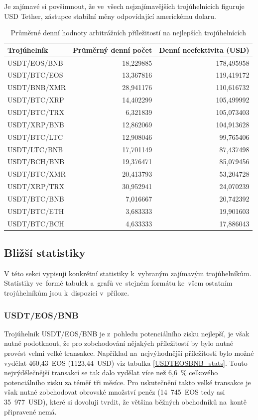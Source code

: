 \documentclass[thesis=B,czech]{FITthesis}[2019/03/21]
\begin{document}
Je zajímavé si povšimnout, že ve~všech nejzajímavějších trojúhelnících figuruje USD Tether, zástupce stabilní měny odpovídající americkému dolaru.


\begin{table}\centering
\caption{Průměrné denní hodnoty arbitrážních příležitostí na nejlepších trojúhelnících}
\label{table_combined_best}
\begin{tabular}{|| l | r | r ||}\hline Trojúhelník & Průměrný denní počet & Denní neefektivita (USD)\\
 \hline
 \hline USDT/EOS/BNB & 18,229885 & 178,495958\\ 
 \hline USDT/BTC/EOS & 13,367816 & 119,419172\\ 
 \hline USDT/BNB/XMR & 28,941176 & 110,616732\\ 
 \hline USDT/BTC/XRP & 14,402299 & 105,499992\\ 
 \hline USDT/BTC/TRX & 6,321839 & 105,073403\\ 
 \hline USDT/XRP/BNB & 12,862069 & 104,913628\\ 
 \hline USDT/BTC/LTC & 12,908046 & 99,765406\\ 
 \hline USDT/LTC/BNB & 17,701149 & 87,437498\\ 
 \hline USDT/BCH/BNB & 19,376471 & 85,079456\\ 
 \hline USDT/BTC/XMR & 20,413793 & 53,204728\\ 
 \hline USDT/XRP/TRX & 30,952941 & 24,070239\\ 
 \hline USDT/BTC/BNB & 7,016667 & 20,742392\\ 
 \hline USDT/BTC/ETH & 3,683333 & 19,901603\\ 
 \hline USDT/BTC/BCH & 4,633333 & 17,886043\\ 
 \hline
\end{tabular}
\end{table}

\subsection{Bližší statistiky}
V této sekci vypisuji konkrétní statistiky k~vybraným zajímavým trojúhelníkům. Statistiky ve~formě tabulek a~grafů ve~stejném formátu ke~všem ostatním trojúhelníkům jsou k~dispozici v~příloze.

\subsubsection{USDT/EOS/BNB}
Trojúhelník USDT/EOS/BNB je z~pohledu potenciálního zisku nejlepší, je však nutné podotknout, že pro zobchodování nějakých příležitostí by bylo nutné provést velmi velké transakce. Například na~nejvýhodnější příležitosti bylo možné vydělat 460,43~EOS (1123,44~USD) viz tabulka \ref{USDTEOSBNB_stats}. Touto nejvýdělečnější transakcí se tak dalo vydělat více než 6,6~\% celkového potenciálního zisku za téměř tři měsíce. Pro uskutečnění takto velké transakce je však nutné zobchodovat obrovské množství peněz (14~745~EOS tedy asi 35~977~USD), které si dovoluji tvrdit, že většina běžných obchodníků na~kontě připravené nemá.
\end{document}
